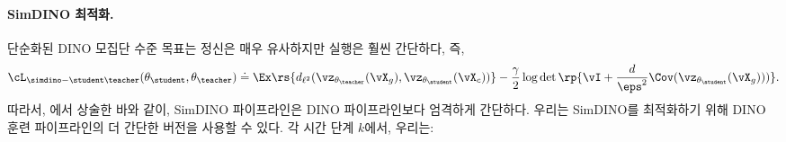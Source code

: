 \documentclass[../../book-main_ko.tex]{subfiles}
\begin{document}
\paragraph{SimDINO 최적화.} 단순화된 DINO 모집단 수준 목표는 정신은 매우 유사하지만 실행은 훨씬 간단하다, 즉,
\begin{equation}\label{eq:simdino_loss_teacherstudent}
    \cL_{\simdino-\student\teacher}(\theta_{\student}, \theta_{\teacher}) \doteq
    \Ex\rs{d_{\ell^{2}}(\vz_{\theta_{\teacher}}(\vX_{g}),
    \vz_{\theta_{\student}}(\vX_{c}))} - \frac{\gamma}{2}\log\det\rp{\vI + \frac{d}{\eps^{2}}\Cov(\vz_{\theta_{\student}}(\vX_{g})))}.
\end{equation}
따라서, 에서 상술한 바와 같이, SimDINO 파이프라인은 DINO 파이프라인보다 엄격하게 간단하다. 우리는 SimDINO를 최적화하기 위해 DINO 훈련 파이프라인의 더 간단한 버전을 사용할 수 있다. 각 시간 단계 \(k\)에서, 우리는:
\end{document}
